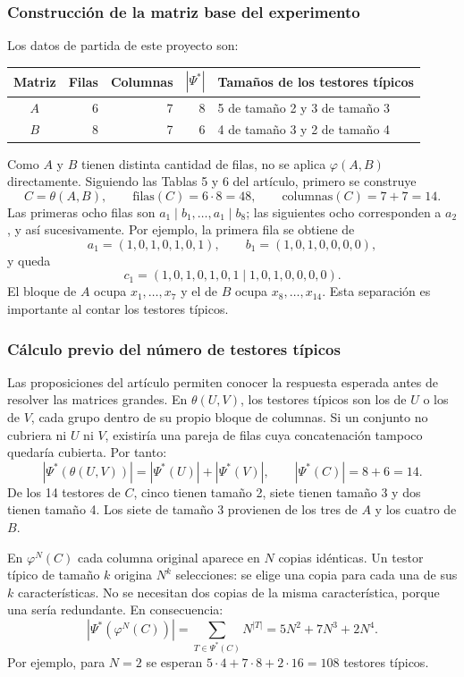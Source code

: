 \subsubsection*{Construcción de la matriz base del experimento}

Los datos de partida de este proyecto son:
\begin{center}
\begin{tabular}{c r r r l}
\toprule
Matriz & Filas & Columnas & $|\Psi^*|$ & Tamaños de los testores típicos\\
\midrule
$A$ & 6 & 7 & 8 & 5 de tamaño 2 y 3 de tamaño 3\\
$B$ & 8 & 7 & 6 & 4 de tamaño 3 y 2 de tamaño 4\\
\bottomrule
\end{tabular}
\end{center}

Como $A$ y $B$ tienen distinta cantidad de filas, no se aplica
$\varphi(A,B)$ directamente. Siguiendo las Tablas 5 y 6 del artículo,
primero se construye
\[
C=\theta(A,B),\qquad
\text{filas}(C)=6\cdot8=48,\qquad
\text{columnas}(C)=7+7=14.
\]
Las primeras ocho filas son $a_1\mid b_1,\ldots,a_1\mid b_8$;
las siguientes ocho corresponden a $a_2$, y así sucesivamente.
Por ejemplo, la primera fila se obtiene de
\[
a_1=(1,0,1,0,1,0,1),\qquad b_1=(1,0,1,0,0,0,0),
\]
y queda
\[
c_1=(1,0,1,0,1,0,1\mid1,0,1,0,0,0,0).
\]
El bloque de $A$ ocupa $x_1,\ldots,x_7$ y el de $B$ ocupa
$x_8,\ldots,x_{14}$. Esta separación es importante al contar
los testores típicos.

\subsubsection*{Cálculo previo del número de testores típicos}

Las proposiciones del artículo permiten conocer la respuesta
esperada antes de resolver las matrices grandes. En $\theta(U,V)$,
los testores típicos son los de $U$ o los de $V$, cada grupo dentro
de su propio bloque de columnas. Si un conjunto no cubriera ni
$U$ ni $V$, existiría una pareja de filas cuya concatenación
tampoco quedaría cubierta. Por tanto:
\[
|\Psi^*(\theta(U,V))|=|\Psi^*(U)|+|\Psi^*(V)|,
\qquad |\Psi^*(C)|=8+6=14.
\]
De los 14 testores de $C$, cinco tienen tamaño 2, siete tienen
tamaño 3 y dos tienen tamaño 4. Los siete de tamaño 3 provienen
de los tres de $A$ y los cuatro de $B$.

En $\varphi^N(C)$ cada columna original aparece en $N$ copias
idénticas. Un testor típico de tamaño $k$ origina $N^k$
selecciones: se elige una copia para cada una de sus $k$
características. No se necesitan dos copias de la misma
característica, porque una sería redundante. En consecuencia:
\[
|\Psi^*(\varphi^N(C))|
=\sum_{T\in\Psi^*(C)}N^{|T|}
=5N^2+7N^3+2N^4.
\]
Por ejemplo, para $N=2$ se esperan
$5\cdot4+7\cdot8+2\cdot16=108$ testores típicos.

